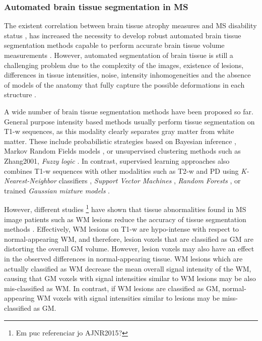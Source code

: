 \subsubsection{Automated brain tissue segmentation in MS}

The existent correlation between brain tissue atrophy measures and MS disability status \cite{Filippi2013, Fisher2008}, has increased the necessity to develop robust automated brain tissue segmentation methods capable to perform accurate brain tissue volume measurements \cite{Giorgio2013}. However, automated segmentation of brain tissue is still a challenging problem due to the complexity of the images, existence of lesions, differences in tissue intensities, noise, intensity inhomogeneities and the absence of models of the anatomy that fully capture the possible deformations in each structure \cite{Cabezas2011, Kapur1996}. 

A wide number of brain tissue segmentation methods have been proposed so far. General purpose intensity based methods usually perform tissue segmentation on T1-w sequences, as this modality clearly separates gray matter from white matter. These include probabilistic strategies based on Bayesian inference \cite{Ashburner2005,Marroquin2002, Roy2012,Shattuck2001}, Markov Random Fields models \cite{Bricq2008, Tohka2010, Zhang2001}, or unsupervised clustering methods such as Zhang2001, \textit{Fuzzy logic} \cite{Caldairou2011, Pham2001}. In contrast, supervised learning approaches also combines T1-w sequences with other modalities such as T2-w and PD using \textit{K-Nearest-Neighbor} classifiers \cite{deBoer2009,Vrooman2013}, \textit{Support Vector Machines} \cite{Akselrod2006,Opbroek2013}, \textit{Random Forests} \cite{yi2009,Mahapatra2014}, or trained \textit{Gaussian mixture models} \cite{Rajchl2015}. 

However, different studies \footnote{Em puc referenciar jo AJNR2015?} have shown that tissue abnormalities found in MS image patients such as WM lesions reduce the accuracy of tissue segmentation methods \cite{Battaglini2012, Chard2010}. Effectively, WM lesions on T1-w are hypo-intense with respect to normal-appearing WM, and  therefore, lesion voxels that are classified as GM are distorting the overall GM volume. However, lesion voxels may also have an effect in the observed differences in normal-appearing tissue. WM lesions which are actually classified as WM decrease the mean overall signal intensity of the WM, causing that GM voxels with signal intensities similar to WM lesions may be also mis-classified as WM.  In contrast, if WM lesions are classified as GM, normal-appearing WM voxels with signal intensities similar to lesions may be miss-classified as GM. 
 
